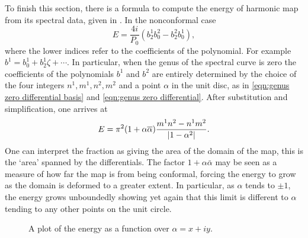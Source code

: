\documentclass{article}
\begin{document}
To finish this section, there is a formula to compute the energy of harmonic map from its spectral data, given in \cite[Theorem 12.17]{Hitchin1990}. In the nonconformal case
\[
E = \frac{4i}{P_0} (b^1_2 b^2_0 - b^2_2 b^1_0),
\]
where the lower indices refer to the coefficients of the polynomial. For example $b^1 = b^1_0 + b^1_2 \zeta + \cdots$. In particular, when the genus of the spectral curve is zero the coefficients of the polynomials $b^1$ and $b^2$ are entirely determined by the choice of the four integers $n^1,m^1,n^2, m^2$ and a point $\alpha$ in the unit disc, as in \eqref{eqn:genus zero differential basis} and \eqref{eqn:genus zero differential}. After substitution and simplification, one arrives at
\[
E = \pi^2(1+\alpha\overline{\alpha})\frac{m^1 n^2 - n^1 m^2}{\left|1-\alpha^2\right|}.
\]
One can interpret the fraction as giving the area of the domain of the map, this is the `area' spanned by the differentials. 
The factor $1+\alpha\bar{\alpha}$ may be seen as a measure of how far the map is from being conformal, forcing the energy to grow as the domain is deformed to a greater extent. 
In particular, as $\alpha$ tends to $\pm 1$, the energy grows unboundedly showing yet again that this limit is different to $\alpha$ tending to any other points on the unit circle.

\begin{center}
\begin{figure}
\caption{
A plot of the energy as a function over $\alpha = x + i y$.}
\end{figure}
\end{center}
\end{document}
